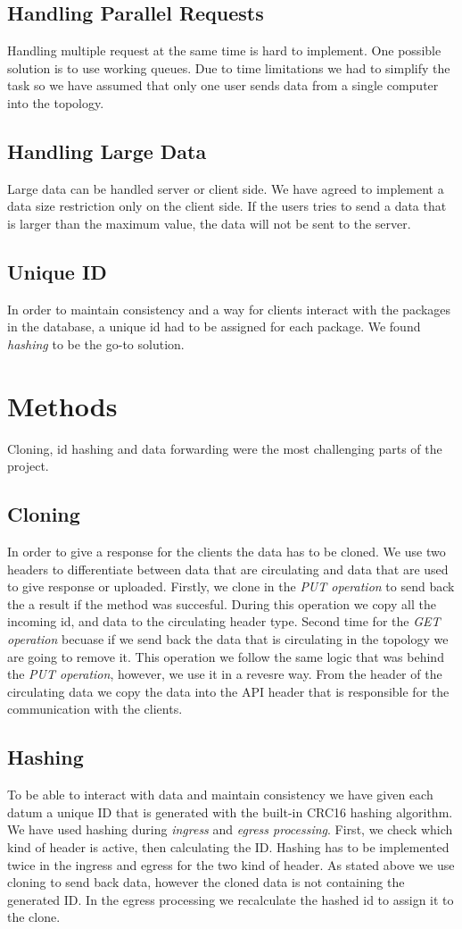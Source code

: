 \documentclass[sigconf,natbib=false]{acmart}
\begin{document}
\subsection{Handling Parallel Requests}
Handling multiple request at the same time is hard to implement. One possible solution is to use working queues. Due to time limitations we had to simplify the task so we have assumed that only one user sends data from a single computer into the topology.
\subsection{Handling Large Data}
Large data can be handled server or client side. We have agreed to implement a data size restriction only on the client side. If the users tries to send a data that is larger than the maximum value, the data will not be sent to the server.
\subsection{Unique ID}
In order to maintain consistency and a way for clients interact with the packages in the database, a unique id had to be assigned for each package. We found \textit{hashing} to be the go-to solution.
\section{Methods}
Cloning, id hashing and data forwarding were the most challenging parts of the project.
\subsection{Cloning}
In order to give a response for the clients the data has to be cloned. We use two headers to differentiate between data that are circulating and data that are used to give response or uploaded. Firstly, we clone in the \textit{PUT operation} to send back the a result if the method was succesful. During this operation we copy all the incoming id, and data to the circulating header type. Second time for the \textit{GET operation} becuase if we send back the data that is circulating in the topology we are going to remove it. This operation we follow the same logic that was behind the \textit{PUT operation}, however, we use it in a revesre way. From the header of the circulating data we copy the data into the API header that is responsible for the communication with the clients.
\cite{cloning1} \cite{cloning2}
\subsection{Hashing}
To be able to interact with data and maintain consistency we have given each datum a unique ID that is generated with the built-in CRC16 hashing \cite{hashing2} algorithm. We have used hashing during \textit{ingress} and \textit{egress processing}. First, we check which kind of header is active, then calculating the ID. Hashing has to be implemented twice in the ingress and egress for the two kind of header. As stated above we use cloning to send back data, however the cloned data is not containing the generated ID. In the egress processing we recalculate the hashed id to assign it to the clone.
\cite{hashing1}
\end{document}
